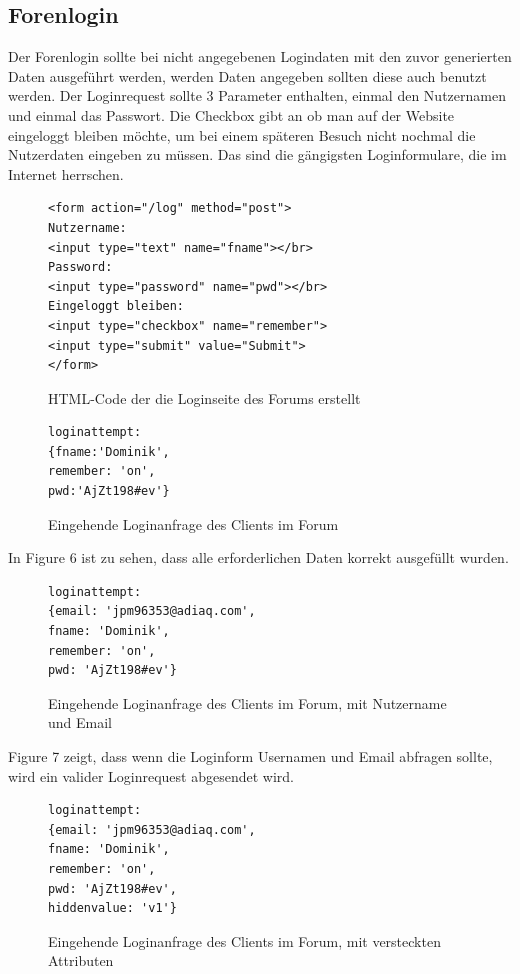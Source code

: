 \subsection{Forenlogin}
Der Forenlogin sollte bei nicht angegebenen Logindaten mit den zuvor generierten Daten ausgeführt werden, werden Daten angegeben sollten diese auch benutzt werden. Der Loginrequest sollte 3 Parameter enthalten, einmal den Nutzernamen und einmal das Passwort. Die Checkbox gibt an ob man auf der Website eingeloggt bleiben möchte, um bei einem späteren Besuch nicht nochmal die Nutzerdaten eingeben zu müssen. Das sind die gängigsten Loginformulare, die im Internet herrschen.

\begin{figure}[ht]
\begin{lstlisting}[language=HTML5]
<form action="/log" method="post">
Nutzername: 
<input type="text" name="fname"></br>
Password: 
<input type="password" name="pwd"></br>
Eingeloggt bleiben: 
<input type="checkbox" name="remember">
<input type="submit" value="Submit">
</form>
\end{lstlisting}
\caption{HTML-Code der die Loginseite des Forums erstellt}
\end{figure}
\newpage

\begin{figure}[h!]
\begin{lstlisting}[language=HTML5]
loginattempt: 
{fname:'Dominik',
remember: 'on',
pwd:'AjZt198#ev'}
\end{lstlisting}
\caption{Eingehende Loginanfrage des Clients im Forum}
\end{figure}

In Figure 6 ist zu sehen, dass alle erforderlichen Daten korrekt ausgefüllt wurden.

\begin{figure}[h!]
\begin{lstlisting}[language=HTML5]
loginattempt:
{email: 'jpm96353@adiaq.com',
fname: 'Dominik',
remember: 'on',
pwd: 'AjZt198#ev'}
\end{lstlisting}
\caption{Eingehende Loginanfrage des Clients im Forum, mit Nutzername und Email}
\end{figure}
Figure 7 zeigt, dass wenn die Loginform Usernamen und Email abfragen sollte, wird ein valider Loginrequest abgesendet wird.

\begin{figure}[h!]
\begin{lstlisting}[language=HTML5]
loginattempt:
{email: 'jpm96353@adiaq.com',
fname: 'Dominik',
remember: 'on',
pwd: 'AjZt198#ev',
hiddenvalue: 'v1'}
\end{lstlisting}
\caption{Eingehende Loginanfrage des Clients im Forum, mit versteckten Attributen}
\end{figure}

